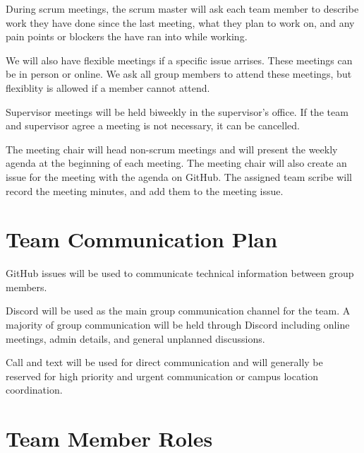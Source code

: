 \documentclass{article}
\begin{document}
During scrum meetings, the scrum master will ask each team member to describe
work they have done since the last meeting, what they plan to work on, and any
pain points or blockers the have ran into while working.\newline

We will also have flexible meetings if a specific issue arrises. These meetings can be in
person or online. We ask all group members to attend these meetings, but
flexiblity is allowed if a member cannot attend.\newline

Supervisor meetings will be held biweekly in the supervisor's office. If the
team and supervisor agree a meeting is not necessary, it can be cancelled.
\newline

The meeting chair will head non-scrum meetings and will present the weekly
agenda at the beginning of each meeting. The meeting chair will also create an
issue for the meeting with the agenda on GitHub. The assigned team scribe will
record the meeting minutes, and add them to the meeting issue.

\section{Team Communication Plan}

GitHub issues will be used to communicate technical information 
between group members.\newline

Discord will be used as the main group communication channel for the team. A majority 
of group communication will be held through Discord including online meetings, admin details, 
and general unplanned discussions.\newline

Call and text will be used for direct communication
and will generally be reserved for high priority and urgent communication or 
campus location coordination. 

\section{Team Member Roles}
\end{document}
